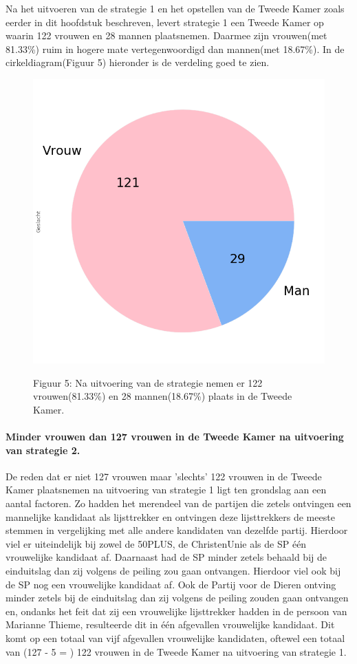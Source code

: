 Na het uitvoeren van de strategie 1 en het opstellen van de Tweede Kamer zoals eerder in dit hoofdstuk beschreven, levert strategie 1 een Tweede Kamer op waarin 122 vrouwen en 28 mannen plaatsnemen. Daarmee zijn vrouwen(met 81.33\%) ruim in hogere mate vertegenwoordigd dan mannen(met 18.67\%). In de cirkeldiagram(Figuur 5) hieronder is de verdeling goed te zien. 

\begin{figure}[H]
\begin{center}
	\includegraphics[width=0.7\linewidth]{pie_chart_topN.png}
		\begin{center}
			Figuur 5: Na uitvoering van de strategie nemen er 122 vrouwen(81.33\%) en 28 mannen(18.67\%) plaats in de Tweede Kamer. 
		\end{center}
\end{center}
\end{figure}

\newpage
\paragraph{Minder vrouwen dan 127 vrouwen in de Tweede Kamer na uitvoering van strategie 2.}
De reden dat er niet 127 vrouwen maar 'slechts' 122 vrouwen in de Tweede Kamer plaatsnemen na uitvoering van strategie 1 ligt ten grondslag aan een aantal factoren. Zo hadden het merendeel van de partijen die zetels ontvingen een mannelijke kandidaat als lijsttrekker en ontvingen deze lijsttrekkers de meeste stemmen in vergelijking met alle andere kandidaten van dezelfde partij. Hierdoor viel er uiteindelijk bij zowel de 50PLUS, de ChristenUnie als de SP één vrouwelijke kandidaat af. Daarnaast had de SP minder zetels behaald bij de einduitslag dan zij volgens de peiling zou gaan ontvangen. Hierdoor viel ook bij de SP nog een vrouwelijke kandidaat af. Ook de Partij voor de Dieren ontving minder zetels bij de einduitslag dan zij volgens de peiling zouden gaan ontvangen en, ondanks het feit dat zij een vrouwelijke lijsttrekker hadden in de persoon van Marianne Thieme, resulteerde dit in één afgevallen vrouwelijke kandidaat. Dit komt op een totaal van vijf afgevallen vrouwelijke kandidaten, oftewel een totaal van (127 - 5 = ) 122 vrouwen in de Tweede Kamer na uitvoering van strategie 1.  

